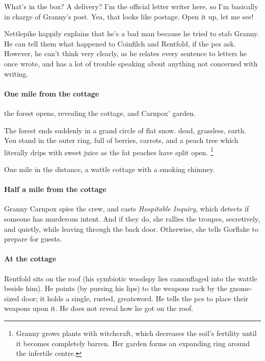 \documentclass[10pt,twoside]{book}
\begin{document}
\begin{speechtext}
  What's in the box?
  A delivery?
  I'm the official letter writer here, so I'm basically in charge of Granny's post.
  Yea, that looks like postage.
  Open it up, let me see!
\end{speechtext}

Nettlepike happily explains that he's a bad man because he tried to stab Granny.
He can tell them what happened to Coinfilch and Rentfold, if the \glspl{pc} ask.
However, he can't think very clearly, as he relates every sentence to letters he once wrote, and has a lot of trouble speaking about anything not concerned with writing.

\paragraph{One mile from the cottage}
the forest opens, revealing the cottage, and Carnpox' garden.

\begin{boxtext}
  The forest ends suddenly in
  \ifnum{}%
    a grand circle of flat snow.%
  \else%
    dead, grassless, earth.
    You stand in the outer ring, full of berries, carrots, and a peach tree which literally drips with sweet juice as the fat peaches have split open.%
  \fi%
  \footnote{Granny grows plants with \gls{witchcraft}, which decreases the soil's fertility until it becomes completely barren.
  Her garden forms an expanding ring around the infertile centre.}

  One mile in the distance, a wattle cottage with a smoking chimney.
\end{boxtext}

\paragraph{Half a mile from the cottage}
Granny Carnpox spies the crew, and casts \textit{Hospitable Inquiry}, which detects if someone has murderous intent.
And if they do, she rallies the troupes, secretively, and quietly, while leaving through the back door.
Otherwise, she tells Gorflake to prepare for guests.

\paragraph{At the cottage}
Rentfold sits on the roof (his symbiotic \gls{woodspy} lies camouflaged into the wattle beside him).
He points (by pursing his lips) to the weapons rack by the gnome-sized door; it holds a single, rusted, greatsword.
He tells the \glspl{pc} to place their weapons upon it.
He does not reveal how he got on the roof.
\end{document}

